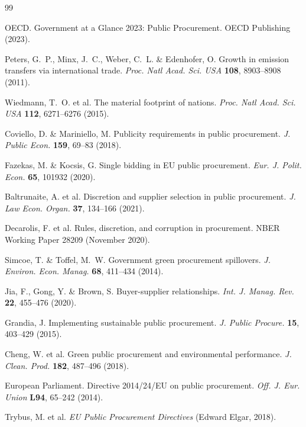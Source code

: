\documentclass[11pt,a4paper]{article}
\begin{document}
\begin{thebibliography}{99}

OECD. Government at a Glance 2023: Public Procurement. OECD Publishing (2023).

Peters, G.~P., Minx, J.~C., Weber, C.~L. \& Edenhofer, O. Growth in emission transfers via international trade. \textit{Proc. Natl Acad. Sci. USA} \textbf{108}, 8903--8908 (2011).

Wiedmann, T.~O. et al. The material footprint of nations. \textit{Proc. Natl Acad. Sci. USA} \textbf{112}, 6271--6276 (2015).

Coviello, D. \& Mariniello, M. Publicity requirements in public procurement. \textit{J. Public Econ.} \textbf{159}, 69--83 (2018).

Fazekas, M. \& Kocsis, G. Single bidding in EU public procurement. \textit{Eur. J. Polit. Econ.} \textbf{65}, 101932 (2020).

Baltrunaite, A. et al. Discretion and supplier selection in public procurement. \textit{J. Law Econ. Organ.} \textbf{37}, 134--166 (2021).

Decarolis, F. et al. Rules, discretion, and corruption in procurement. NBER Working Paper 28209 (November 2020).

Simcoe, T. \& Toffel, M.~W. Government green procurement spillovers. \textit{J. Environ. Econ. Manag.} \textbf{68}, 411--434 (2014).

Jia, F., Gong, Y. \& Brown, S. Buyer-supplier relationships. \textit{Int. J. Manag. Rev.} \textbf{22}, 455--476 (2020).

Grandia, J. Implementing sustainable public procurement. \textit{J. Public Procure.} \textbf{15}, 403--429 (2015).

Cheng, W. et al. Green public procurement and environmental performance. \textit{J. Clean. Prod.} \textbf{182}, 487--496 (2018).

European Parliament. Directive 2014/24/EU on public procurement. \textit{Off. J. Eur. Union} \textbf{L94}, 65--242 (2014). 

Trybus, M. et al. \textit{EU Public Procurement Directives} (Edward Elgar, 2018).


\end{thebibliography}
\end{document}
